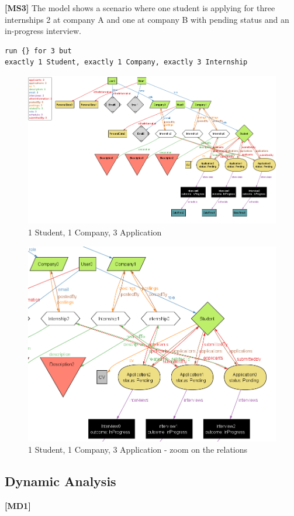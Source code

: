 \textbf{[MS3]} The model shows a scenario where one student is applying for three internships 2 at company A and one at company B with pending status and an in-progress interview.
\begin{lstlisting}
run {} for 3 but 
exactly 1 Student, exactly 1 Company, exactly 3 Internship
\end{lstlisting}
\begin{figure}[H]
    \centering
    \includegraphics[width=1\linewidth]{RASD//Images/1st2com.png}
    \caption{1 Student, 1 Company, 3 Application}
    \label{fig:enter-label}
\end{figure}
\begin{figure}[H]
    \centering
    \includegraphics[width=0.75\linewidth]{RASD//Images/1st2comzoom.png}
    \caption{1 Student, 1 Company, 3 Application - zoom on the relations}
    \label{fig:enter-label}
\end{figure}

\subsection{Dynamic Analysis}
\textbf{[MD1]}

